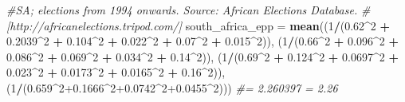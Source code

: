 \documentclass[]{article}
\newenvironment{Shaded}{\begin{snugshade}}{\end{snugshade}}
\newcommand{\CommentTok}[1]{\textcolor[rgb]{0.56,0.35,0.01}{\textit{#1}}}
\newcommand{\DecValTok}[1]{\textcolor[rgb]{0.00,0.00,0.81}{#1}}
\newcommand{\FloatTok}[1]{\textcolor[rgb]{0.00,0.00,0.81}{#1}}
\newcommand{\KeywordTok}[1]{\textcolor[rgb]{0.13,0.29,0.53}{\textbf{#1}}}
\newcommand{\NormalTok}[1]{#1}
\newcommand{\OperatorTok}[1]{\textcolor[rgb]{0.81,0.36,0.00}{\textbf{#1}}}
\newcommand{\StringTok}[1]{\textcolor[rgb]{0.31,0.60,0.02}{#1}}
\begin{document}
\begin{Shaded}
\begin{Highlighting}[]
{{{\CommentTok{#SA; elections from 1994 onwards. Source: African Elections Database.}
\CommentTok{#[http://africanelections.tripod.com/]}
\NormalTok{south_africa_epp =}\StringTok{ }\KeywordTok{mean}\NormalTok{((}\DecValTok{1}\OperatorTok{/}\NormalTok{(}\FloatTok{0.62}\OperatorTok{^}\DecValTok{2} \OperatorTok{+}\StringTok{ }\FloatTok{0.2039}\OperatorTok{^}\DecValTok{2} \OperatorTok{+}\StringTok{ }\FloatTok{0.104}\OperatorTok{^}\DecValTok{2} \OperatorTok{+}\StringTok{ }\FloatTok{0.022}\OperatorTok{^}\DecValTok{2} \OperatorTok{+}\StringTok{ }\FloatTok{0.07}\OperatorTok{^}\DecValTok{2} \OperatorTok{+}\StringTok{ }\FloatTok{0.015}\OperatorTok{^}\DecValTok{2}\NormalTok{)),}
\NormalTok{                        (}\DecValTok{1}\OperatorTok{/}\NormalTok{(}\FloatTok{0.66}\OperatorTok{^}\DecValTok{2} \OperatorTok{+}\StringTok{ }\FloatTok{0.096}\OperatorTok{^}\DecValTok{2} \OperatorTok{+}\StringTok{ }\FloatTok{0.086}\OperatorTok{^}\DecValTok{2} \OperatorTok{+}\StringTok{ }\FloatTok{0.069}\OperatorTok{^}\DecValTok{2} \OperatorTok{+}\StringTok{ }\FloatTok{0.034}\OperatorTok{^}\DecValTok{2} \OperatorTok{+}\StringTok{ }\FloatTok{0.14}\OperatorTok{^}\DecValTok{2}\NormalTok{)),}
\NormalTok{                        (}\DecValTok{1}\OperatorTok{/}\NormalTok{(}\FloatTok{0.69}\OperatorTok{^}\DecValTok{2} \OperatorTok{+}\StringTok{ }\FloatTok{0.124}\OperatorTok{^}\DecValTok{2} \OperatorTok{+}\StringTok{ }\FloatTok{0.0697}\OperatorTok{^}\DecValTok{2} \OperatorTok{+}\StringTok{ }\FloatTok{0.023}\OperatorTok{^}\DecValTok{2} \OperatorTok{+}\StringTok{ }\FloatTok{0.0173}\OperatorTok{^}\DecValTok{2} \OperatorTok{+}\StringTok{ }\FloatTok{0.0165}\OperatorTok{^}\DecValTok{2} \OperatorTok{+}\StringTok{ }\FloatTok{0.16}\OperatorTok{^}\DecValTok{2}\NormalTok{)),}
\NormalTok{                        (}\DecValTok{1}\OperatorTok{/}\NormalTok{(}\FloatTok{0.659}\OperatorTok{^}\DecValTok{2}\FloatTok{+0.1666}\OperatorTok{^}\DecValTok{2}\FloatTok{+0.0742}\OperatorTok{^}\DecValTok{2}\FloatTok{+0.0455}\OperatorTok{^}\DecValTok{2}\NormalTok{)))}
\CommentTok{#= 2.260397 = 2.26}

}}}
\end{Highlighting}
\end{Shaded}
\end{document}
